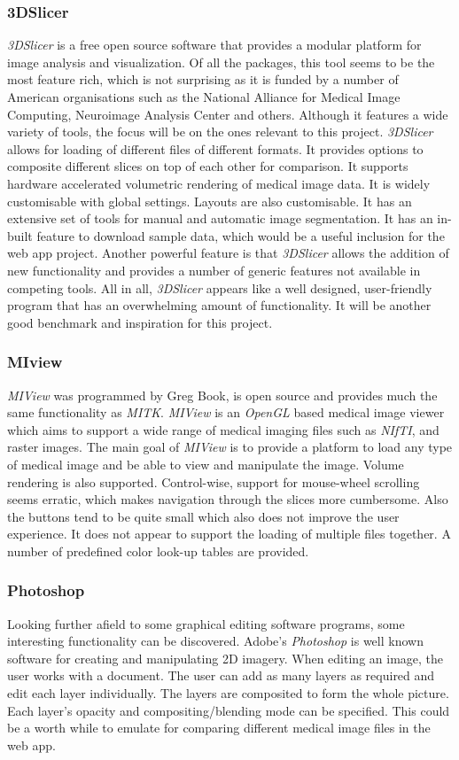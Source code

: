 \documentclass[a4paper,11pt,titlepage]{article}
\begin{document}
\subsubsection{3DSlicer}
\textit{3DSlicer} is a free open source software that provides a modular platform for image analysis and visualization. Of all the packages, this tool seems to be the most feature rich, which is not surprising as it is funded by a number of American organisations such as  the National Alliance for Medical Image Computing, Neuroimage Analysis Center and others. Although it features a wide variety of tools, the focus will be on the ones relevant to this project. \textit{3DSlicer} allows for loading of different files of different formats. It provides options to composite different slices on top of each other for comparison. It supports hardware accelerated volumetric rendering of medical image data. It is widely customisable with global settings. Layouts are also customisable. It has an extensive set of tools for manual and automatic image segmentation. It has an in-built feature to download sample data, which would be a useful inclusion for the web app project. Another powerful feature is that \textit{3DSlicer} allows the addition of new functionality and provides a number of generic features not available in competing tools. All in all, \textit{3DSlicer} appears like a well designed, user-friendly program that has an overwhelming amount of functionality. It will be another good benchmark and inspiration for this project.

\subsubsection{MIview}
\textit{MIView} was programmed by Greg Book, is open source and provides much the same functionality as \textit{MITK}. \textit{MIView} is an \textit{OpenGL} based medical image viewer which aims to support a wide range of medical imaging files such as \textit{NIfTI}, and raster images. The main goal of \textit{MIView} is to provide a platform to load any type of medical image and be able to view and manipulate the image. Volume rendering is also supported. Control-wise, support for mouse-wheel scrolling seems erratic, which makes navigation through the slices more cumbersome. Also the buttons tend to be quite small which also does not improve the user experience. It does not appear to support the loading of multiple files together. A number of predefined color look-up tables are provided.

\subsubsection{Photoshop}
Looking further afield to some graphical editing software programs, some interesting functionality can be discovered. Adobe's \textit{Photoshop} is well known software for creating and manipulating 2D imagery. When editing an image, the user works with a document. The user can add as many layers as required and edit each layer individually. The layers are composited to form the whole picture. Each layer's opacity and compositing/blending mode can be specified. This could be a worth while to emulate for comparing different medical image files in the web app.
\end{document}
